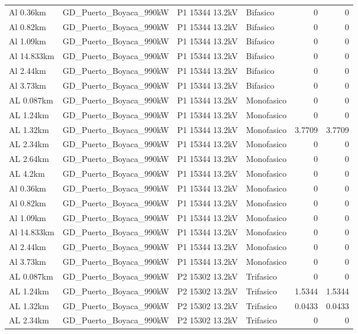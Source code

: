 \documentclass[11pt,a4paper]{article}
\begin{document}
\begin{longtable}{llllrr}
Al 0.36km & GD\_Puerto\_Boyaca\_990kW & P1 15344 13.2kV & Bifasico & 0 & 0 \\
Al 0.82km & GD\_Puerto\_Boyaca\_990kW & P1 15344 13.2kV & Bifasico & 0 & 0 \\
Al 1.09km & GD\_Puerto\_Boyaca\_990kW & P1 15344 13.2kV & Bifasico & 0 & 0 \\
Al 14.833km & GD\_Puerto\_Boyaca\_990kW & P1 15344 13.2kV & Bifasico & 0 & 0 \\
Al 2.44km & GD\_Puerto\_Boyaca\_990kW & P1 15344 13.2kV & Bifasico & 0 & 0 \\
Al 3.73km & GD\_Puerto\_Boyaca\_990kW & P1 15344 13.2kV & Bifasico & 0 & 0 \\
AL 0.087km & GD\_Puerto\_Boyaca\_990kW & P1 15344 13.2kV & Monofasico & 0 & 0 \\
AL 1.24km & GD\_Puerto\_Boyaca\_990kW & P1 15344 13.2kV & Monofasico & 0 & 0 \\
AL 1.32km & GD\_Puerto\_Boyaca\_990kW & P1 15344 13.2kV & Monofasico & 3.7709 & 3.7709 \\
AL 2.34km & GD\_Puerto\_Boyaca\_990kW & P1 15344 13.2kV & Monofasico & 0 & 0 \\
AL 2.64km & GD\_Puerto\_Boyaca\_990kW & P1 15344 13.2kV & Monofasico & 0 & 0 \\
AL 4.2km & GD\_Puerto\_Boyaca\_990kW & P1 15344 13.2kV & Monofasico & 0 & 0 \\
Al 0.36km & GD\_Puerto\_Boyaca\_990kW & P1 15344 13.2kV & Monofasico & 0 & 0 \\
Al 0.82km & GD\_Puerto\_Boyaca\_990kW & P1 15344 13.2kV & Monofasico & 0 & 0 \\
Al 1.09km & GD\_Puerto\_Boyaca\_990kW & P1 15344 13.2kV & Monofasico & 0 & 0 \\
Al 14.833km & GD\_Puerto\_Boyaca\_990kW & P1 15344 13.2kV & Monofasico & 0 & 0 \\
Al 2.44km & GD\_Puerto\_Boyaca\_990kW & P1 15344 13.2kV & Monofasico & 0 & 0 \\
Al 3.73km & GD\_Puerto\_Boyaca\_990kW & P1 15344 13.2kV & Monofasico & 0 & 0 \\
AL 0.087km & GD\_Puerto\_Boyaca\_990kW & P2 15302 13.2kV & Trifasico & 0 & 0 \\
AL 1.24km & GD\_Puerto\_Boyaca\_990kW & P2 15302 13.2kV & Trifasico & 1.5344 & 1.5344 \\
AL 1.32km & GD\_Puerto\_Boyaca\_990kW & P2 15302 13.2kV & Trifasico & 0.0433 & 0.0433 \\
AL 2.34km & GD\_Puerto\_Boyaca\_990kW & P2 15302 13.2kV & Trifasico & 0 & 0 \\

\end{longtable}
\end{document}
